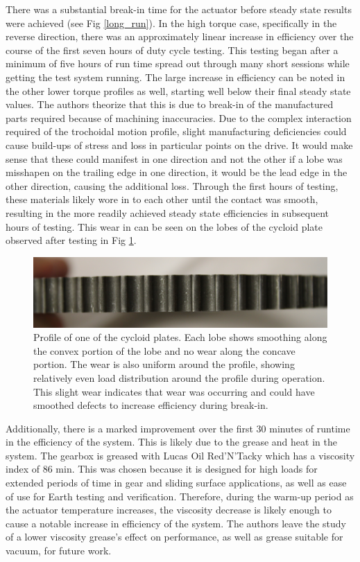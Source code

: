 
There was a substantial break-in time for the actuator before steady state results were achieved (see Fig \ref{long_run}).
In the high torque case, specifically in the reverse direction, there was an approximately linear increase in efficiency over the course of the first seven hours of duty cycle testing.
This testing began after a minimum of five hours of run time spread out through many short sessions while getting the test system running.
The large increase in efficiency can be noted in the other lower torque profiles as well, starting well below their final steady state values.
The authors theorize that this is due to break-in of the manufactured parts required because of machining inaccuracies.
Due to the complex interaction required of the trochoidal motion profile, slight manufacturing deficiencies could cause build-ups of stress and loss in particular points on the drive.
It would make sense that these could manifest in one direction and not the other if a lobe was misshapen on the trailing edge in one direction, it would be the lead edge in the other direction, causing the additional loss.
Through the first hours of testing, these materials likely wore in to each other until the contact was smooth, resulting in the more readily achieved steady state efficiencies in subsequent hours of testing.
This wear in can be seen on the lobes of the cycloid plate observed after testing in Fig \ref{cycloid_plate}.

\begin{figure}[t]
	\centering
	\includegraphics[width=\linewidth]{images/cycloid_plate}
	\caption{Profile of one of the cycloid plates. Each lobe shows smoothing along the convex portion of the lobe and no wear along the concave portion. The wear is also uniform around the profile, showing relatively even load distribution around the profile during operation. This slight wear indicates that wear was occurring and could have smoothed defects to increase efficiency during break-in.}
	\label{cycloid_plate}
\end{figure}

Additionally, there is a marked improvement over the first 30 minutes of runtime in the efficiency of the system.
This is likely due to the grease and heat in the system.
The gearbox is greased with Lucas Oil Red'N'Tacky which has a viscosity index of 86 min.
This was chosen because it is designed for high loads for extended periods of time in gear and sliding surface applications, as well as ease of use for Earth testing and verification.
Therefore, during the warm-up period as the actuator temperature increases, the viscosity decrease is likely enough to cause a notable increase in efficiency of the system.
The authors leave the study of a lower viscosity grease's effect on performance, as well as grease suitable for vacuum, for future work.

